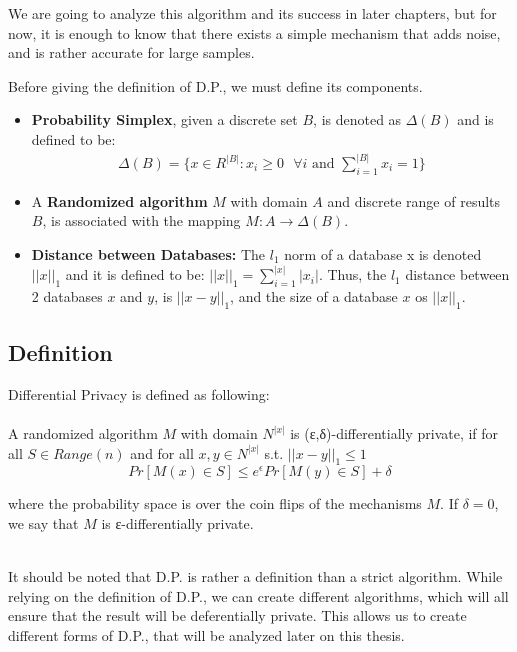 We are going to analyze this algorithm and its success in later chapters, but for now, it is enough to know that there exists a simple mechanism that adds noise, and is rather accurate for large samples.

Before giving the definition of D.P., we must define its components. 

\begin{itemize}
    \item \textbf{Probability Simplex}, given a discrete set $B$, is denoted as $\Delta(B)$ and is defined to be:
    \begin{align*}
        \Delta(B) = \{ x\in R^{|B|}: x_i \geq 0 \text { } \forall i \text{ and } \sum_{i=1}^{|B|} x_i = 1\}
    \end{align*}
    \item A \textbf {Randomized algorithm} $M$ with domain $A$ and discrete range of results $B$, is associated with the mapping $M: A\rightarrow\Delta(B)$. 
    \item \textbf{Distance between Databases:} The $l_1$ norm of a database x is denoted $||x||_1$ and it is defined to be: $||x||_1 = \sum_{i = 1}^{|x|} |x_i|$. Thus, the $l_1$ distance between 2 databases $x$ and $y$, is $||x-y||_1$, and the size of a database $x$ os $||x||_1$.
    
\end{itemize}

\subsection{Definition}
Differential Privacy is defined as following:
\\
\\
A randomized algorithm $M$ with domain $N^{|x|}$ is (ε,δ)-differentially private, if for all $S \in Range(n)$ and for all $x,y \in N^{|x|}$ s.t. $||x - y||_1 \leq 1$
$$ Pr[M(x) \in S] \leq e^\epsilon Pr[M(y) \in S] + \delta$$

where the probability space is over the coin flips of the mechanisms $M$. If $\delta = 0$, we say that $M$ is ε-differentially private.

\\
It should be noted that D.P. is rather a definition than a strict algorithm. While relying on the definition of D.P., we can create different algorithms, which will all ensure that the result will be deferentially private. This allows us to create different forms of D.P., that will be analyzed later on this thesis.

